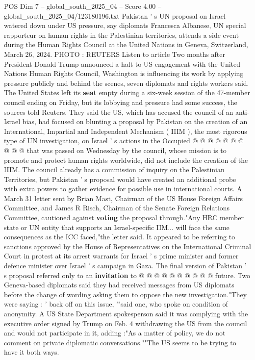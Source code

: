 \begin{textsample}{POS Dim 7 – global\_south\_2025\_04 – Score 4.00 – global\_south\_2025\_04/123180196.txt}  \label{ex:f7_pos_410}
Pakistan ' s UN proposal on Israel watered down under US pressure, say diplomats Francesca Albanese, UN special rapporteur on human rights in the Palestinian territories, attends a side event during the Human Rights Council at the United Nations in Geneva, Switzerland, March 26, 2024.
PHOTO : REUTERS Listen to article Two months after President Donald Trump announced a halt to US engagement with the United Nations Human Rights Council, Washington is influencing its work by applying pressure publicly and behind the scenes, seven diplomats and rights workers said.
The United States left its \textbf{seat} empty during a six-week session of the 47-member council ending on Friday, but its lobbying and pressure had some success, the sources told Reuters.
They said the US, which has accused the council of an anti-Israel bias, had focused on blunting a proposal by Pakistan on the creation of an International, Impartial and Independent Mechanism ( IIIM ), the most rigorous type of UN investigation, on Israel ' s actions in the Occupied @ @ @ @ @ @ @ @ @ @ that was passed on Wednesday by the council, whose mission is to promote and protect human rights worldwide, did not include the creation of the IIIM.
The council already has a commission of inquiry on the Palestinian Territories, but Pakistan ' s proposal would have created an additional probe with extra powers to gather evidence for possible use in international courts.
A March 31 letter sent by Brian Mast, Chairman of the US House Foreign Affairs Committee, and James R Risch, Chairman of the Senate Foreign Relations Committee, cautioned against \textbf{voting} the proposal through."Any HRC member state or UN entity that supports an Israel-specific IIM... will face the same consequences as the ICC faced,"the letter said.
It appeared to be referring to sanctions approved by the House of Representatives on the International Criminal Court in protest at its arrest warrants for Israel ' s prime minister and former defence minister over Israel ' s campaign in Gaza.
The final version of Pakistan ' s proposal referred only to an \textbf{invitation} to @ @ @ @ @ @ @ @ @ @ future.
Two Geneva-based diplomats said they had received messages from US diplomats before the change of wording asking them to oppose the new investigation."They were saying : ' back off on this issue, '"said one, who spoke on condition of anonymity.
A US State Department spokesperson said it was complying with the executive order signed by Trump on Feb. 4 withdrawing the US from the council and would not participate in it, adding :"As a matter of policy, we do not comment on private diplomatic conversations.""The US seems to be trying to have it both ways.

\end{textsample}
